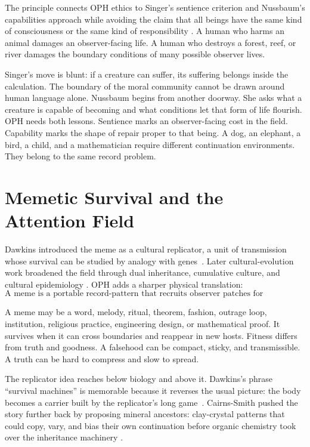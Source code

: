 \documentclass[11pt]{article}
\theoremstyle{remark}
\theoremstyle{plain}
\begin{document}
The principle connects OPH ethics to Singer's sentience criterion and
Nussbaum's capabilities approach while avoiding the claim that all beings have
the same kind of consciousness or the same kind of responsibility
\cite{Singer1975,Nussbaum2006,Nussbaum2023}. A human who harms an animal
damages an observer-facing life. A human who destroys a forest, reef, or river
damages the boundary conditions of many possible observer lives.

Singer's move is blunt: if a creature can suffer, its suffering belongs inside
the calculation. The boundary of the moral community cannot be drawn around
human language alone. Nussbaum begins from another doorway. She asks what a
creature is capable of becoming and what conditions let that form of life
flourish. OPH needs both lessons. Sentience marks an observer-facing cost in
the field. Capability marks the shape of repair proper to that being. A dog, an
elephant, a bird, a child, and a mathematician require different continuation
environments. They belong to the same record problem.

\section{Memetic Survival and the Attention Field}

Dawkins introduced the meme as a cultural replicator, a unit of transmission
whose survival can be studied by analogy with genes~\cite{Dawkins1976}. Later
cultural-evolution work broadened the field through dual inheritance,
cumulative culture, and cultural epidemiology
\cite{SEPCulturalEvolution,BoydRicherson1985,Henrich2015,Sperber1996}. OPH
adds a sharper physical translation:
\[
\boxed{
\text{A meme is a portable record-pattern that recruits observer patches for replication.}
}
\]

A meme may be a word, melody, ritual, theorem, fashion, outrage loop,
institution, religious practice, engineering design, or mathematical proof. It
survives when it can cross boundaries and reappear in new hosts. Fitness differs
from truth and goodness. A falsehood can be compact, sticky, and transmissible.
A truth can be hard to compress and slow to spread.

The replicator idea reaches below biology and above it. Dawkins's phrase
``survival machines'' is memorable because it reverses the usual picture: the
body becomes a carrier built by the replicator's long game~\cite{Dawkins1976}.
Cairns-Smith pushed the story further back by proposing mineral ancestors:
clay-crystal patterns that could copy, vary, and bias their own continuation
before organic chemistry took over the inheritance machinery
\cite{CairnsSmith1982}.
\end{document}
